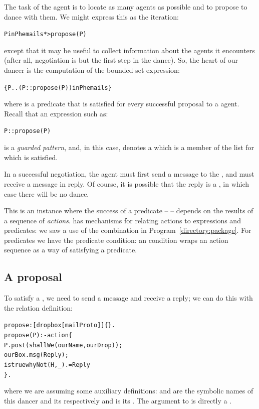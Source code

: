 The task of the \mail agent is to locate as many \phemail agents as possible and to propose to dance with them. We might express this as the iteration:
\begin{alltt}
P in Phemails *> propose(P)
\end{alltt}
except that it may be useful to collect information about the \phemail agents it encounters (after all, negotiation is but the first step in the dance). So, the heart of our \mail dancer is the computation of the bounded set expression:
\begin{alltt}
\{ P .. (P::propose(P)) in Phemails \}
\end{alltt}
where  is a predicate that is satisfied for every successful proposal to a \phemail agent. Recall that an expression such as:
\begin{alltt}
P::propose(P)
\end{alltt}
is a \emph{guarded pattern}, and, in this case, denotes a  which is a member of the list  for which  is satisfied.

In a successful negotiation, the \mail agent must first send a  message to the \phemail, and must receive a  message in reply. Of course, it is possible that the reply is a , in which case there will be no dance.

This is an instance where the success of a predicate --  -- depends on the results of a sequence of \emph{actions}. \go has mechanisms for relating actions to expressions and predicates: we saw a use of the  combination in Program~\vref{directory:package}. For predicates we have the  predicate condition: an  condition wraps an action sequence as a way of satisfying a predicate.

\subsection{A \mail proposal}

To satisfy a , we need to send a message and receive a reply; we can do this with the relation definition:
\begin{alltt}
propose:[dropbox[mailProto]]\{\}.
propose(P) :- action\{
    P.post(shallWe(ourName,ourDrop));
    ourBox.msg(Reply);
    istrue whyNot(H,\_).=Reply
  \}.
\end{alltt}
where we are assuming some auxiliary definitions:  and  are the symbolic names of this \mail dancer and its  respectively and  is its . The argument to  is directly a .

